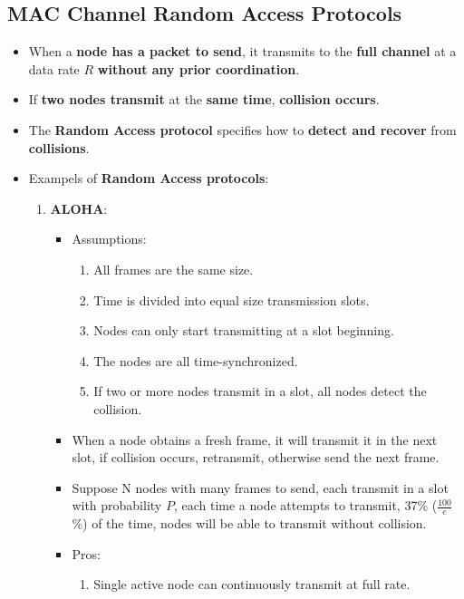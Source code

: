 \documentclass{article}
\begin{document}
    \subsection*{MAC Channel Random Access Protocols}
    \begin{itemize}
        \item When a \textbf{node has a packet to send}, it transmits to the \textbf{full channel} at a data rate $R$ \textbf{without any prior coordination}.
        \item If \textbf{two nodes transmit} at the \textbf{same time}, \textbf{collision occurs}.
        \item The \textbf{Random Access protocol} specifies how to \textbf{detect and recover} from \textbf{collisions}.
        \item Exampels of \textbf{Random Access protocols}: 
        \begin{enumerate}
            \item \textbf{ALOHA}:
            \begin{itemize}
                \item Assumptions: 
                \begin{enumerate}
                    \item All frames are the same size.
                    \item Time is divided into equal size transmission slots.
                    \item Nodes can only start transmitting at a slot beginning.
                    \item The nodes are all time-synchronized.
                    \item If two or more nodes transmit in a slot, all nodes detect the collision.
                \end{enumerate}
                \item When a node obtains a fresh frame, it will transmit it in the next slot, if collision occurs, retransmit, otherwise send the next frame.
                \item Suppose N nodes with many frames to send, each transmit in a slot with probability $P$, each time a node attempts to transmit, 37\% ($\frac{100}{e}$\%) of the time, nodes will be able to transmit without collision.
                \item Pros:
                \begin{enumerate}
                    \item Single active node can continuously transmit at full rate.

\end{enumerate}
\end{itemize}
\end{enumerate}
\end{itemize}
\end{document}
